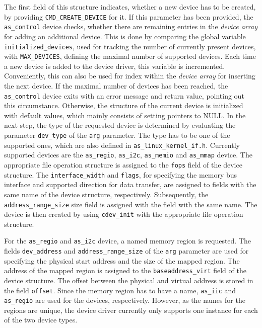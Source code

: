 The first field of this structure indicates, whether a new device has to be created, by providing \texttt{CMD\_CREATE\_DEVICE} for it.
If this parameter has been provided, the \texttt{as\_control} device checks, whether there are remaining entries in the \textit{device array} for adding an additional device.
This is done by comparing the global variable \texttt{initialized\_devices}, used for tracking the number of currently present devices, with \texttt{MAX\_DEVICES}, defining the maximal number of supported devices.
Each time a new device is added to the device driver, this variable is incremented.
Conveniently, this can also be used for index within the \textit{device array} for inserting the next device.
If the maximal number of devices has been reached, the \texttt{as\_control} device exits with an error message and return value, pointing out this circumstance.
Otherwise, the structure of the current device is initialized with default values, which mainly consists of setting pointers to NULL.
In the next step, the type of the requested device is determined by evaluating the parameter \texttt{dev\_type} of the \texttt{arg} parameter.
The type has to be one of the supported ones, which are also defined in \texttt{as\_linux\_kernel\_if.h}.
Currently supported devices are the \texttt{as\_regio}, \texttt{as\_i2c}, \texttt{as\_memio} and \texttt{as\_mmap} device.
The appropriate file operation structure is assigned to the \texttt{fops} field of the device structure.
The \texttt{interface\_width} and \texttt{flags}, for specifying the memory bus interface and supported direction for data transfer,  are assigned to fields with the same name of the device structure, respectively.
Subsequently, the \texttt{address\_range\_size} size field is assigned with the field with the same name.
The device is then created by using \texttt{cdev\_init} with the appropriate file operation structure.

For the \texttt{as\_regio} and \texttt{as\_i2c} device, a named memory region is requested.
The fields \texttt{dev\_address} and \texttt{address\_range\_size} of the \texttt{arg} parameter are used for specifying the physical start address and the size of the mapped region.
The address of the mapped region is assigned to the \texttt{baseaddress\_virt} field of the device structure.
The offset between the physical and virtual address is stored in the field \texttt{offset}.
Since the memory region has to have a name, \texttt{as\_iic} and \texttt{as\_regio} are used for the devices, respectively. 
However, as the names for the regions are unique, the device driver currently only supports one instance for each of the two device types.

